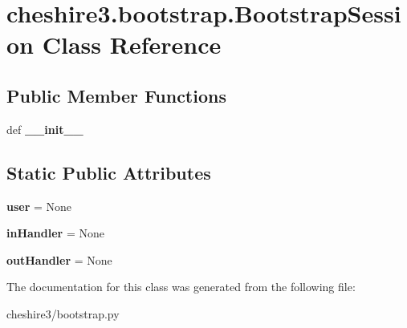 \hypertarget{classcheshire3_1_1bootstrap_1_1_bootstrap_session}{\section{cheshire3.\-bootstrap.\-Bootstrap\-Session Class Reference}
\label{classcheshire3_1_1bootstrap_1_1_bootstrap_session}
}
\subsection*{Public Member Functions}
\begin{DoxyCompactItemize}
\item 
\hypertarget{classcheshire3_1_1bootstrap_1_1_bootstrap_session_a7bb2814415857b0f244d22c45dcb8926}{def {\bfseries \-\_\-\-\_\-init\-\_\-\-\_\-}}\label{classcheshire3_1_1bootstrap_1_1_bootstrap_session_a7bb2814415857b0f244d22c45dcb8926}

\end{DoxyCompactItemize}
\subsection*{Static Public Attributes}
\begin{DoxyCompactItemize}
\item 
\hypertarget{classcheshire3_1_1bootstrap_1_1_bootstrap_session_a03764501b3d109630d8dd930554c1ff5}{{\bfseries user} = None}\label{classcheshire3_1_1bootstrap_1_1_bootstrap_session_a03764501b3d109630d8dd930554c1ff5}

\item 
\hypertarget{classcheshire3_1_1bootstrap_1_1_bootstrap_session_a83ffe70f345915e25bb08232f9a5a557}{{\bfseries in\-Handler} = None}\label{classcheshire3_1_1bootstrap_1_1_bootstrap_session_a83ffe70f345915e25bb08232f9a5a557}

\item 
\hypertarget{classcheshire3_1_1bootstrap_1_1_bootstrap_session_a4e3ed335f29c445443a16aa4af1f7edf}{{\bfseries out\-Handler} = None}\label{classcheshire3_1_1bootstrap_1_1_bootstrap_session_a4e3ed335f29c445443a16aa4af1f7edf}

\end{DoxyCompactItemize}


The documentation for this class was generated from the following file\-:\begin{DoxyCompactItemize}
\item 
cheshire3/bootstrap.\-py\end{DoxyCompactItemize}
